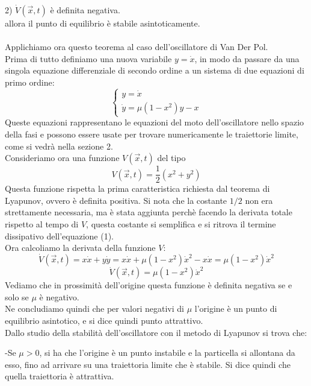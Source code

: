 \documentclass[12pt]{article}
\begin{document}
2) $\dot{V}(\vec{x},t)$ è definita negativa. \\
allora il punto di equilibrio è stabile asintoticamente. \\ \\
Applichiamo ora questo teorema al caso dell'oscillatore di Van Der Pol.  \\
Prima di tutto definiamo una nuova variabile $y = \dot{x}$, in modo da passare da una singola equazione differenziale di secondo ordine a un sistema di due equazioni di primo ordine:
\begin{equation}
	\begin{cases}
		y = \dot{x} \\
		\dot{y} = \mu(1-x^2)y - x
	\end{cases}
\end{equation}
Queste equazioni rappresentano le equazioni del moto dell'oscillatore nello spazio della fasi e possono essere usate per trovare numericamente le traiettorie limite, come si vedrà nella sezione 2. \\
Consideriamo ora una funzione $V(\vec{x},t)$ del tipo 
\begin{equation}
	V(\vec{x},t) = \frac{1}{2}(x^2 + y^2)
\end{equation}
Questa funzione rispetta la prima caratteristica richiesta dal teorema di Lyapunov, ovvero è definita positiva. Si nota che la costante $1/2$ non era strettamente necessaria, ma è stata aggiunta perchè facendo la derivata totale rispetto al tempo di $V$, questa costante si semplifica e si ritrova il termine dissipativo dell'equazione (1). \\
Ora calcoliamo la derivata della funzione $V$:
$$
	\dot{V}(\vec{x},t) = x\dot{x} + y\dot{y} = x\dot{x} + \mu(1-x^2)\dot{x}^2-x\dot{x} = \mu(1-x^2)\dot{x}^2
$$
\begin{equation}
	\dot{V}(\vec{x},t) = \mu(1-x^2)\dot{x}^2
\end{equation}
Vediamo che in prossimità dell'origine questa funzione è definita negativa se e solo se $\mu$ è negativo. \\
Ne concludiamo quindi che per valori negativi di $\mu$ l'origine è un punto di equilibrio asintotico, e si dice quindi punto attrattivo. \\
Dallo studio della stabilità dell'oscillatore con il metodo di Lyapunov si trova che: 

-Se $\mu>0$, si ha che l'origine è un punto instabile e la particella si allontana da esso, fino ad arrivare su una traiettoria limite che è stabile. Si dice quindi che quella traiettoria è attrattiva. 
\end{document}

